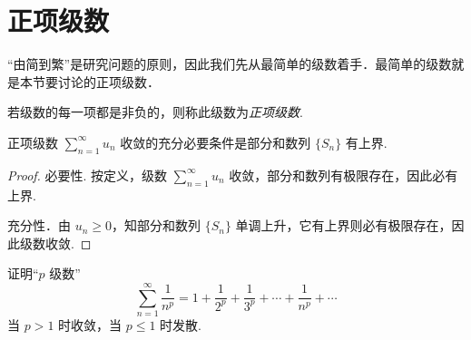 \section{正项级数}

``由简到繁''是研究问题的原则，因此我们先从最简单的级数着手．最简单的级数就是本节要讨论的正项级数．

\begin{definition}\label{def:10-2}
若级数的每一项都是非负的，则称此级数为\emph{正项级数}.
\end{definition}

\begin{theorem}\label{thm:10-5}
正项级数 $\sum_{n=1}^{\infty}u_{n}$ 收敛的充分必要条件是部分和数列 $\{S_{n}\}$ 有上界.
\end{theorem}

\begin{proof}
必要性. 按定义，级数 $\sum_{n=1}^{\infty}u_{n}$ 收敛，部分和数列有极限存在，因此必有上界.

充分性．由 $u_n\geq0$，知部分和数列 $\{S_n\}$ 单调上升，它有上界则必有极限存在，因此级数收敛.
\end{proof}

\begin{example}\label{ex:10-3-1}
证明``$p$ 级数''
\[
\sum_{n=1}^{\infty}\frac{1}{n^{p}}=1+\frac{1}{2^{p}}+\frac{1}{3^{p}}+\cdots+\frac{1}{n^{p}}+\cdots
\]
当 $p>1$ 时收敛，当 $p\leq1$ 时发散.
\end{example}

